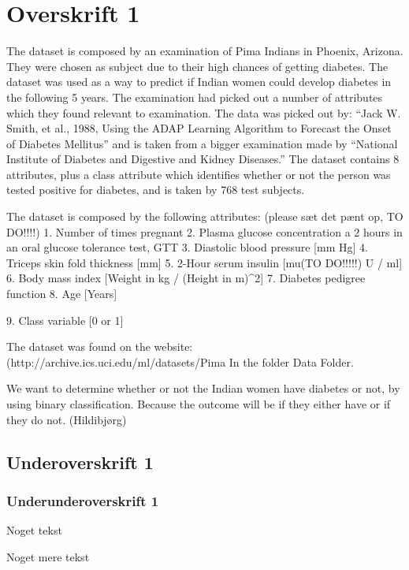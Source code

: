 \section{Overskrift 1}

The dataset is composed by an examination of Pima Indians in Phoenix, Arizona.
They were chosen as subject due to their high chances of getting diabetes. The dataset was used as a way to predict if Indian women could develop diabetes in the following 5 years. The examination had picked out a number of attributes which they found relevant to examination.
The data was picked out by: “Jack W. Smith, et al., 1988, Using the ADAP Learning Algorithm to Forecast the Onset of Diabetes Mellitus” and is taken from a bigger examination made by “National Institute of Diabetes and Digestive and Kidney Diseases.”
The dataset contains 8 attributes, plus a class attribute which identifies whether or not the person was tested positive for diabetes, and is taken by 768 test subjects.

The dataset is composed by the following attributes:
(please sæt det pænt op, TO DO!!!!)
1. Number of times pregnant
2. Plasma glucose concentration a 2 hours in an oral glucose tolerance test, GTT
3. Diastolic blood pressure [mm Hg]
4. Triceps skin fold thickness [mm]
5. 2-Hour serum insulin [mu(TO DO!!!!!) U / ml]
6. Body mass index [Weight in kg / (Height in m)^2]
7. Diabetes pedigree function
8. Age [Years]

9. Class variable [0 or 1]

The dataset was found on the website: (http://archive.ics.uci.edu/ml/datasets/Pima%
In the folder Data Folder.

We want to determine whether or not the Indian women have diabetes or not, by using binary classification. Because the outcome will be if they either have or if they do not.
(Hildibjørg)

\subsection{Underoverskrift 1}

\subsubsection{Underunderoverskrift 1}

Noget tekst

Noget mere tekst


